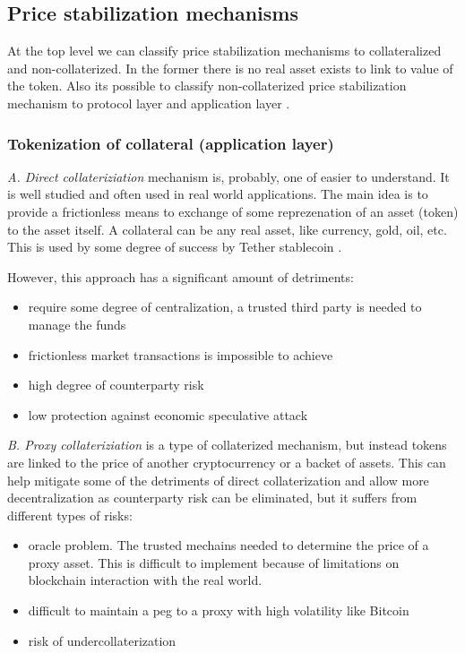 \documentclass[12pt, a4paper, twocolumn]{article}
\begin{document}
\subsection{Price stabilization mechanisms}
At the top level we can classify price stabilization mechanisms to collateralized and non-collaterized. In the former there is no real asset exists to link to value of the token. 
Also its possible to classify non-collaterized price stabilization mechanism to protocol layer and application layer  \cite{DBLP:journals/corr/abs-1906-06037}. 

\subsubsection{Tokenization of collateral (application layer)}

 \textit{A. Direct collateriziation} mechanism is, probably, one of easier to understand. It is well studied and often used in real world applications. The main idea is to provide a frictionless means to exchange of some reprezenation of an asset (token) to the asset itself. A collateral can be any real asset, like currency, gold, oil, etc. This is used by some degree of success by Tether stablecoin \cite{tether}. 

However, this approach has a significant amount of detriments:
\begin{itemize}
\item require some degree of centralization, a trusted third party is needed to manage the funds
\item frictionless market transactions is impossible to achieve
\item high degree of counterparty risk
\item low protection against economic speculative attack
\end{itemize}

\textit{B. Proxy collateriziation} is a type of collaterized mechanism, but instead tokens are linked to the price of another cryptocurrency or a backet of assets. This can help mitigate some of the detriments of direct collaterization and allow more decentralization as counterparty risk can be eliminated, but it suffers from different types of risks:
 \begin{itemize}
\item oracle problem. The trusted mechains needed to determine the price of a proxy asset. This is difficult to implement because of limitations on blockchain interaction with the real world. 
\item difficult to maintain a peg to a proxy with high volatility like Bitcoin
\item risk of undercollaterization
\end{itemize}
\end{document}

